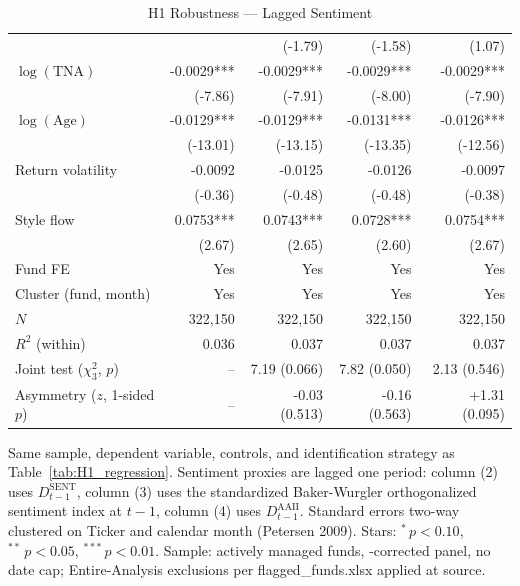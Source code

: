 \begin{table}[!htbp]
{\begin{tabular*}{\linewidth}{@{\extracolsep{\fill}}lrrrr}
 &  & (-1.79) & (-1.58) & (1.07)\\
$\log(\text{TNA})$ & -0.0029*** & -0.0029*** & -0.0029*** & -0.0029***\\
 & (-7.86) & (-7.91) & (-8.00) & (-7.90)\\
$\log(\text{Age})$ & -0.0129*** & -0.0129*** & -0.0131*** & -0.0126***\\
 & (-13.01) & (-13.15) & (-13.35) & (-12.56)\\
Return volatility & -0.0092 & -0.0125 & -0.0126 & -0.0097\\
 & (-0.36) & (-0.48) & (-0.48) & (-0.38)\\
Style flow & 0.0753*** & 0.0743*** & 0.0728*** & 0.0754***\\
 & (2.67) & (2.65) & (2.60) & (2.67)\\
\midrule
Fund FE & Yes & Yes & Yes & Yes\\
Cluster (fund, month) & Yes & Yes & Yes & Yes\\
$N$ & 322,150 & 322,150 & 322,150 & 322,150\\
$R^2$ (within) & 0.036 & 0.037 & 0.037 & 0.037\\
Joint test ($\chi^2_3$, $p$) & -- & 7.19 (0.066) & 7.82 (0.050) & 2.13 (0.546)\\
Asymmetry ($z$, 1-sided $p$) & -- & -0.03 (0.513) & -0.16 (0.563) & +1.31 (0.095)\\
\bottomrule
\end{tabular*}%
}\sbefit
\fi
\setlength{\tabletempwidth}{\wd\tabletempbox}
\ifdim\tabletempwidth>\linewidth\setlength{\tabletempwidth}{\linewidth}\fi
\begin{minipage}{\tabletempwidth}
\captionsetup{width=\linewidth}
\caption{H1 Robustness --- Lagged Sentiment}\label{tab:H1_lagged}
\ifdim\wd\tabletempbox>\linewidth
  \resizebox{\linewidth}{!}{\usebox{\tabletempbox}}
\else
  \usebox{\tabletempbox}
\fi
\par\medskip
\begin{singlespace}\tablefont\noindent
Same sample, dependent variable, controls, and identification strategy as Table~\ref{tab:H1_regression}. Sentiment proxies are lagged one period: column (2) uses $D^{\text{SENT}}_{t-1}$, column (3) uses the standardized Baker-Wurgler orthogonalized sentiment index at $t-1$, column (4) uses $D^{\text{AAII}}_{t-1}$. Standard errors two-way clustered on Ticker and calendar month (Petersen 2009). Stars: $^{*}\,p<0.10$, $^{**}\,p<0.05$, $^{***}\,p<0.01$. Sample: actively managed funds, \textcite{Evans2010}-corrected panel, no date cap; Entire-Analysis exclusions per flagged\_funds.xlsx applied at source.
\end{singlespace}
\end{minipage}
\end{table}

